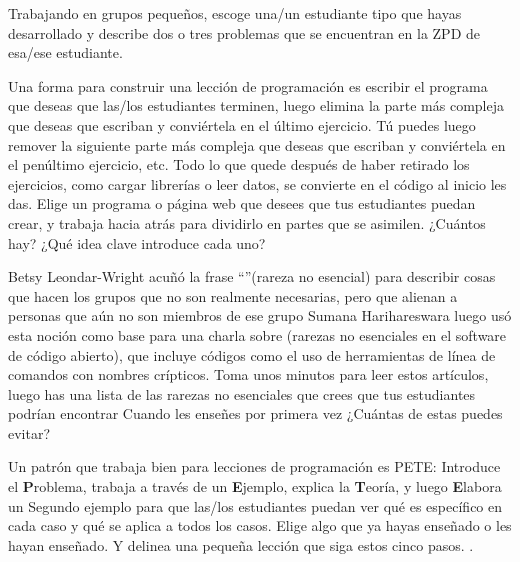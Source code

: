 Trabajando en grupos pequeños,
escoge una/un estudiante tipo que hayas desarrollado
y describe dos o tres problemas que se encuentran en la ZPD de esa/ese estudiante.
 
 
Una forma para construir una lección de programación
es escribir el programa que deseas que las/los estudiantes terminen,
luego elimina la parte más compleja que deseas que escriban
y conviértela en el último ejercicio.
Tú puedes luego remover la siguiente parte más compleja que deseas que escriban
y conviértela en el penúltimo ejercicio, etc.
Todo lo que quede después de haber retirado los ejercicios,
como cargar librerías o leer datos,
se convierte en el código al inicio les das.
 Elige un programa o página web que desees que
tus estudiantes puedan crear,
y trabaja hacia atrás para dividirlo en partes que se asimilen.
¿Cuántos hay?
¿Qué idea clave introduce cada uno?
 
 
Betsy Leondar-Wright acuñó la frase
``''(rareza no esencial)
para describir cosas que hacen los grupos
que no son realmente necesarias,
pero que alienan a personas que aún no son miembros de ese grupo
Sumana Harihareswara luego usó esta noción
como base para una charla sobre
(rarezas no esenciales en el software de código abierto),
que incluye códigos como el uso de herramientas de línea de comandos con nombres crípticos.
Toma unos minutos para leer estos artículos,
luego has una lista de las rarezas no esenciales que crees
que tus estudiantes podrían encontrar
Cuando les enseñes por primera vez
¿Cuántas de estas puedes evitar?
 

Un patrón que trabaja bien para lecciones de programación es PETE:
Introduce el  \textbf{P}roblema,
trabaja a través de un \textbf{E}jemplo,
explica la \textbf{T}eoría,
y luego \textbf{E}labora un Segundo ejemplo
para que las/los estudiantes puedan ver qué es específico en cada caso
y qué se aplica a todos los casos.
Elige algo que ya hayas enseñado o les hayan enseñado.
Y delinea una pequeña lección que siga estos cinco pasos.
.

